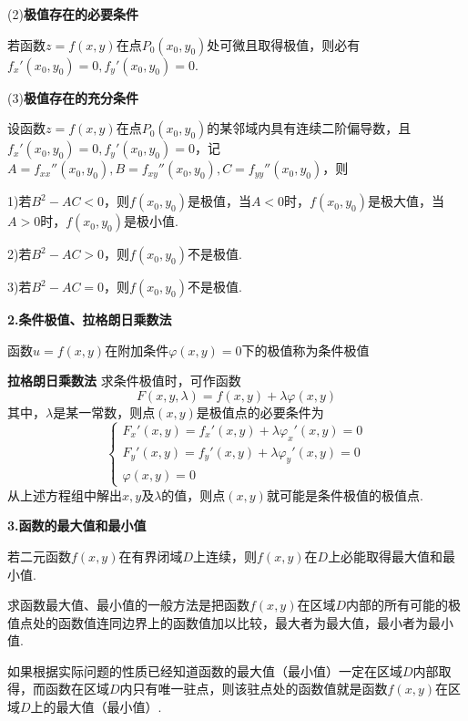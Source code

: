 (2)\textbf{极值存在的必要条件} 

若函数$z=f(x,y)$在点$P_0(x_0,y_0)$处可微且取得极值，则必有$f_x'(x_0,y_0)=0,f_y'(x_0,y_0)=0$.

(3)\textbf{极值存在的充分条件} 

设函数$z=f(x,y)$在点$P_0(x_0,y_0)$的某邻域内具有连续二阶偏导数，且$f_x'(x_0,y_0)=0,f_y'(x_0,y_0)=0$，记$A=f_{xx}''(x_0,y_0),B=f_{xy}''(x_0,y_0),C=f_{yy}''(x_0,y_0)$，则

1)若$B^2-AC<0$，则$f(x_0,y_0)$是极值，当$A<0$时，$f(x_0,y_0)$是极大值，当$A>0$时，$f(x_0,y_0)$是极小值.

2)若$B^2-AC>0$，则$f(x_0,y_0)$不是极值.

3)若$B^2-AC=0$，则$f(x_0,y_0)$不是极值.

\textbf{2.条件极值、拉格朗日乘数法}

函数$u=f(x,y)$在附加条件$\varphi(x,y)=0$下的极值称为条件极值

\textbf{拉格朗日乘数法} \quad 求条件极值时，可作函数
\begin{equation*}
    F(x,y,\lambda)=f(x,y)+\lambda\varphi(x,y)
\end{equation*}
其中，$\lambda$是某一常数，则点$(x,y)$是极值点的必要条件为
\begin{equation*}
    \begin{cases}
        F_x'(x,y)=f_x'(x,y)+\lambda\varphi_x'(x,y)=0\\
        F_y'(x,y)=f_y'(x,y)+\lambda\varphi_y'(x,y)=0\\
        \varphi(x,y)=0
    \end{cases}
\end{equation*}
从上述方程组中解出$x,y$及$\lambda$的值，则点$(x,y)$就可能是条件极值的极值点.

\textbf{3.函数的最大值和最小值}

若二元函数$f(x,y)$在有界闭域$D$上连续，则$f(x,y)$在$D$上必能取得最大值和最小值.

求函数最大值、最小值的一般方法是把函数$f(x,y)$在区域$D$内部的所有可能的极值点处的函数值连同边界上的函数值加以比较，最大者为最大值，最小者为最小值.

如果根据实际问题的性质已经知道函数的最大值（最小值）一定在区域$D$内部取得，而函数在区域$D$内只有唯一驻点，则该驻点处的函数值就是函数$f(x,y)$在区域$D$上的最大值（最小值）.
